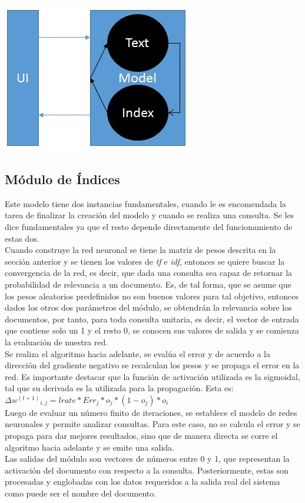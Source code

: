 \documentclass{llncs}
\begin{document}
{\includegraphics[]{appereance}}
{\hfil{}}


\subsection{M\'odulo de \'Indices}

Este modelo tiene dos instancias fundamentales, cuando le es encomendada la tarea de finalizar la creaci\'on del modelo y cuando se realiza una consulta.
Se les dice fundamentales ya que el resto depende directamente del funcionamiento de estas dos.\\
Cuando construye la red neuronal se tiene la matriz de pesos descrita en la secci\'on anterior y se tienen los valores de {\textit{tf}} e {\textit{idf}},
entonces se quiere buscar la convergencia de la red, es decir, que dada una consulta sea capaz de retornar la probabilidad de relevancia a un documento.
Es, de tal forma, que se asume que los pesos aleatorios predefinidos no son buenos valores para tal objetivo, entonces dados los otros dos par\'ametros
del m\'odulo, se obtendr\'an la relevancia sobre los documentos, por tanto, para toda consulta unitaria, es decir, el vector de entrada que contiene solo
un 1 y el resto 0, se conocen sus valores de salida y se comienza la evaluaci\'on de nuestra red.\\
Se realiza el algoritmo hacia adelante, se eval\'ua el error y de acuerdo a la direcci\'on del gradiente negativo se recalculan los pesos y se propaga el error
en la red. Es importante destacar que la funci\'on de activaci\'on utilizada es la sigmoidal, tal que su derivada es la utilizada para la propagaci\'on. Esta es:\\
${\Delta}w{^{(t+1)}}_{i,j} = lrate * Err_{j} * o_j * (1 - o_j) * o_i$\\
Luego de evaluar un n\'umero finito de iteraciones, se establece el modelo de redes neuronales y permite analizar consultas. Para este caso, no se calcula
el error y se propaga para dar mejores resultados, sino que de manera directa se corre el algoritmo hacia adelante y se emite una salida.\\
Las salidas del m\'odulo son vectores de n\'umeros entre 0 y 1, que representan la activaci\'on del documento con respecto a la consulta. Posteriormente,
estas son procesadas y englobadas con los datos requeridos a la salida real del sistema como puede ser el nombre del documento.
\end{document}
